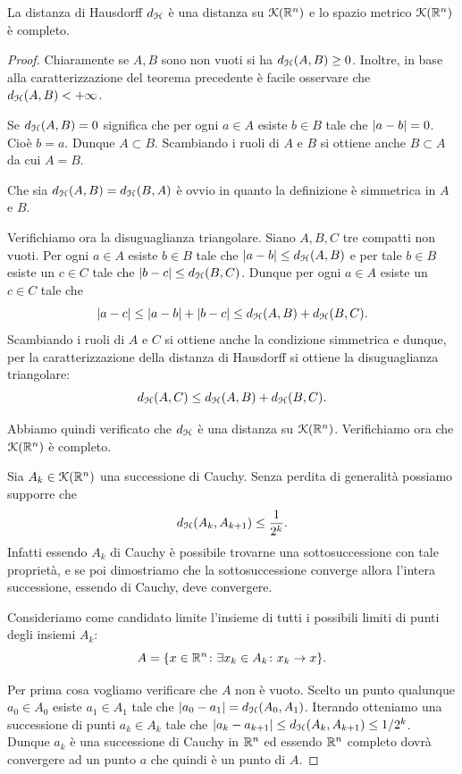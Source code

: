 \begin{theorem}
La distanza di Hausdorff $d_\mathcal H$ è una distanza su $\mathcal K({\mathbb R}^n)$ e lo spazio metrico $\mathcal K({\mathbb R}^n)$ è completo.
\end{theorem}
%
\begin{proof}
Chiaramente se $A,B$ sono non vuoti si ha $d_\mathcal H(A,B) \ge 0$.
Inoltre, in base alla caratterizzazione del teorema precedente è facile osservare che $d_\mathcal H(A,B) < +\infty$.

Se $d_\mathcal H(A,B) = 0$ significa che per ogni $a\in A$ esiste $b\in B$ tale che ${\left|a-b\right|}=0$. Cioè $b=a$. Dunque $A\subset B$. Scambiando i ruoli di $A$ e $B$ si ottiene anche $B\subset A$ da cui $A=B$.

Che sia $d_\mathcal H(A,B) = d_\mathcal H(B,A)$ è ovvio in quanto la definizione è simmetrica in $A$ e $B$.

Verifichiamo ora la disuguaglianza triangolare. Siano $A,B,C$ tre compatti non vuoti. Per ogni $a\in A$ esiste $b\in B$ tale che ${\left|a-b\right|} \le d_\mathcal H(A,B)$ e per tale $b \in B$ esiste un $c\in C$ tale che ${\left|b-c\right|} \le d_\mathcal H(B,C)$. Dunque per ogni $a\in A$ esiste un $c\in C$ tale che
\[
  {\left|a-c\right|} \le {\left|a-b\right|} + {\left|b-c\right|} \le d_\mathcal H(A,B) + d_\mathcal H(B,C).
\]
Scambiando i ruoli di $A$ e $C$ si ottiene anche la condizione simmetrica e dunque, per la caratterizzazione della distanza di Hausdorff si ottiene la disuguaglianza triangolare:
\[
  d_\mathcal H(A,C) \le d_\mathcal H(A,B) + d_\mathcal H(B,C).
\]

Abbiamo quindi verificato che $d_\mathcal H$ è una distanza su $\mathcal K({\mathbb R}^n)$. Verifichiamo ora che $\mathcal K({\mathbb R}^n)$ è completo.

Sia $A_k\in\mathcal K({\mathbb R}^n)$ una successione di Cauchy.
Senza perdita di generalità possiamo supporre che
\[
  d_\mathcal H(A_k,A_{k+1}) \le \frac{1}{2^k}.
\]
Infatti essendo $A_k$ di Cauchy è possibile trovarne una sottosuccessione con tale proprietà, e se poi dimostriamo che la sottosuccessione converge allora l'intera successione, essendo di Cauchy, deve convergere.

Consideriamo come candidato limite l'insieme di tutti i possibili limiti di punti degli insiemi $A_k$:
\[
  A = {\left\{ x\in {\mathbb R}^n
  \colon \exists x_k \in A_k\colon x_k \to x \right\}}.
\]

Per prima cosa vogliamo verificare che $A$ non è vuoto. Scelto un punto qualunque $a_0 \in A_0$ esiste $a_1 \in A_1$ tale che ${\left|a_0 - a_1\right|} = d_\mathcal H(A_0,A_1)$. Iterando otteniamo una successione di punti $a_k \in A_k$ tale che ${\left|a_k - a_{k+1}\right|} \le d_\mathcal H(A_k,A_{k+1}) \le 1/2^k$.
Dunque $a_k$ è una successione di Cauchy in ${\mathbb R}^n$ ed essendo ${\mathbb R}^n$ completo dovrà convergere ad un punto $a$ che quindi è un punto di $A$.


\end{proof}
